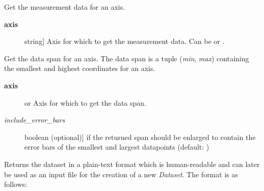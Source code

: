 \documentclass[a4paper,10pt,english]{sphinxmanual}
\begin{document}
\begin{fulllineitems}
\begin{fulllineitems}
\end{fulllineitems}


\begin{fulllineitems}
\label{index:kafe.dataset.Dataset.get_data}
Get the measurement data for an axis.
\begin{description}
\item[{\textbf{axis}}] \leavevmode{[}string{]}
Axis for which to get the measurement data. Can be  or
.

\end{description}

\end{fulllineitems}


\begin{fulllineitems}
\label{index:kafe.dataset.Dataset.get_data_span}
Get the data span for an axis. The data span is a tuple (\emph{min}, \emph{max})
containing the smallest and highest coordinates for an axis.
\begin{description}
\item[{\textbf{axis}}] \leavevmode{[} or \code{'y'}{]}
Axis for which to get the data span.

\item[{\emph{include\_error\_bars}}] \leavevmode{[}boolean (optional){]}
 if the returned span should be enlarged to
contain the error bars of the smallest and largest datapoints
(default: )

\end{description}

\end{fulllineitems}


\begin{fulllineitems}
\label{index:kafe.dataset.Dataset.get_formatted}
Returns the dataset in a plain-text format which is human-readable and
can later be used as an input file for the creation of a new \emph{Dataset}.
\label{index:get-formatted}
The format is as follows:


\end{fulllineitems}
\end{fulllineitems}
\end{document}
